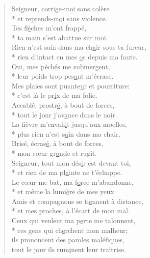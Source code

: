 
\begin{verse}
Seigneur, corrige-m\underline{o}i sans colère \\*
et reprends-m\underline{o}i sans violence. \\

Tes fl\underline{è}ches m’ont frappé, \\*
ta main s’est abatt\underline{u}e sur moi. \\
Rien n’est sain dans ma ch\underline{a}ir sous ta fureur, \\*
rien d’intact en mes \underline{o}s depuis ma faute. \\

Oui, mes péch\underline{é}s me submergent, \\*
leur poids trop pes\underline{a}nt m’écrase. \\
Mes plaies sont puante\underline{u}r et pourriture: \\*
c’est là le pr\underline{i}x de ma folie. \\

Accablé, prostr\underline{é}, à bout de forces, \\*
tout le jour j’av\underline{a}nce dans le noir. \\
La fièvre m’envah\underline{i}t jusqu’aux moelles, \\*
plus rien n’est s\underline{a}in dans ma chair. \\

Brisé, écras\underline{é}, à bout de forces, \\*
mon cœur gr\underline{o}nde et rugit. \\
Seigneur, tout mon dés\underline{i}r est devant toi, \\*
et rien de ma pl\underline{a}inte ne t’échappe. \\

Le cœur me bat, ma f\underline{o}rce m’abandonne, \\*
et même la lumi\underline{è}re de mes yeux. \\
Amis et compagnons se ti\underline{e}nnent à distance, \\*
et mes proches, à l’éc\underline{a}rt de mon mal. \\

Ceux qui veulent ma p\underline{e}rte me talonnent, \\*
ces gens qui ch\underline{e}rchent mon malheur; \\
ils prononcent des par\underline{o}les maléfiques, \\
tout le jour ils rum\underline{i}nent leur traîtrise. \\


\end{verse}
